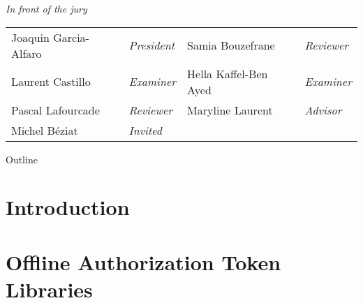 \documentclass[table]{beamer}
\begin{document}
  

\begin{frame}[plain]
\maketitle
\small
{\centering\itshape In front of the jury\par}
\vskip 2mm
\begin{tabular}{l l l l}
Joaquin Garcia-Alfaro & \emph{President} & Samia Bouzefrane & \emph{Reviewer}\\
Laurent Castillo & \emph{Examiner} &  Hella Kaffel-Ben Ayed & \emph{Examiner}\\
Pascal Lafourcade & \emph{Reviewer} & Maryline Laurent & \emph{Advisor}\\
Michel B\'eziat & \emph{Invited} & &\\
\end{tabular}%
\end{frame}

\begin{frame}{Outline}
  \tableofcontents[hideallsubsections]
\end{frame}


\section{Introduction}





\section[OATL]{Offline Authorization Token Libraries}


\end{document}
